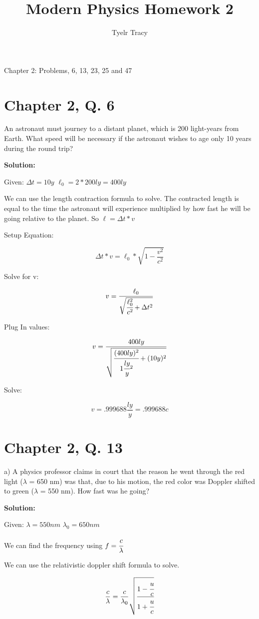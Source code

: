 \documentclass{article}
\title{Modern Physics Homework 2}
\author{Tyelr Tracy}
\begin{document}
\maketitle

Chapter 2: Problems, 6, 13, 23, 25 and 47

\section*{Chapter 2, Q. 6}
An astronaut must journey to a distant planet, which is 200 light-years from Earth. What speed will be necessary if the astronaut wishes to age only 10 years during the round trip?

\textbf{Solution:}

Given: $ \Delta t = 10y $ $ \ell_0 = 2 * 200ly = 400ly $

We can use the length contraction formula to solve. The contracted length is equal to the time the astronaut will experience multiplied by how fast he will be going relative to the planet. So $ \ell = \Delta t * v $

Setup Equation:

$$ \Delta t * v = \ell_0 * \sqrt{1 - \frac{v^2}{c^2}} $$

Solve for v:

$$ v = \frac{\ell_0}{\sqrt{\cfrac{\ell_0^2}{c^2} + \Delta t^2}} $$

Plug In values:

$$ v = \frac{400ly}{\sqrt{\cfrac{(400ly)^2}{1\cfrac{ly}{y}^2} + (10y)^2}} $$

Solve:

$$ v = .999688 \frac{ly}{y} = .999688 c $$


\section*{Chapter 2, Q. 13}
a) A physics professor claims in court that the reason he went through the red light ($\lambda$ = 650 nm) was that, due to his motion, the red color was Doppler shifted to green ($\lambda$ = 550 nm). How fast was he going?

\textbf{Solution:}

Given: $\lambda = 550nm$ $ \lambda_0 = 650nm $

We can find the frequency using $ f = \cfrac{c}{\lambda} $


We can use the relativistic doppler shift formula to solve.

$$\frac{c}{\lambda} = \frac{c}{\lambda_0} \sqrt{\cfrac{1- \cfrac{u}{c}}{1 + \cfrac{u}{c}}}$$
\end{document}
